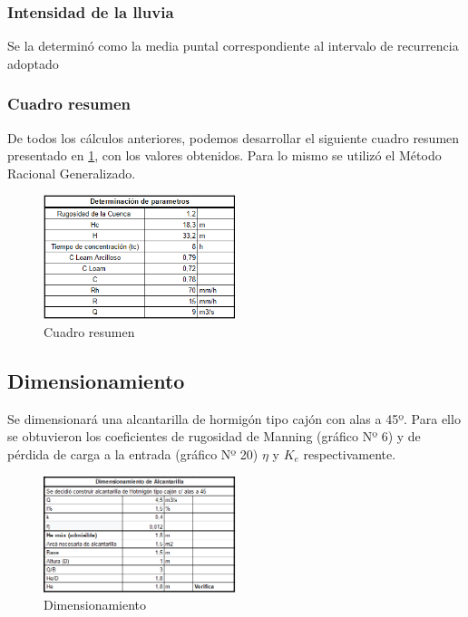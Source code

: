 \documentclass[../main.tex]{subfiles}
\begin{document}
\subsubsection{Intensidad de la lluvia}

Se la determinó como la media puntal correspondiente al intervalo de recurrencia adoptado

\subsubsection{Cuadro resumen}

De todos los cálculos anteriores, podemos desarrollar el siguiente cuadro resumen presentado en \cref{fig:cuadro_resumen}, con los valores obtenidos. Para lo mismo se utilizó el Método Racional Generalizado. \cite{metodo_racional}

\begin{figure}[ht]
    \centering
    \includegraphics[width=0.5\textwidth]{images/google_sheets/Screenshot_7.png}
    \caption{Cuadro resumen}
    \label{fig:cuadro_resumen}
\end{figure}

\subsection{Dimensionamiento}

Se dimensionará una alcantarilla de hormigón tipo cajón con alas a 45º. Para ello se obtuvieron los coeficientes de rugosidad de Manning (gráfico Nº 6) y de pérdida de carga a la entrada (gráfico Nº 20) $\eta$ y $K_e$ respectivamente.\cite{alcantarilla} 

\begin{figure}[h]
    \centering
    \includegraphics[width=0.5\textwidth]{images/google_sheets/Screenshot_18.png}
    \caption{Dimensionamiento}
    \label{fig:Dimensionamiento1}
\end{figure}
\end{document}
